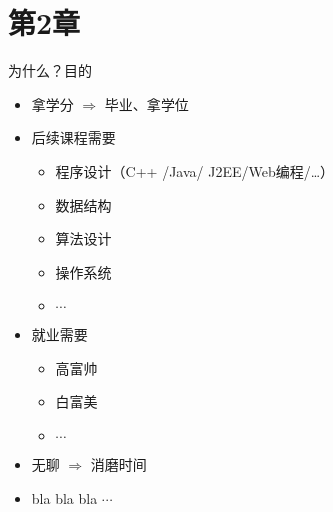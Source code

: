 \section[第2章]{第2章}
\begin{frame}{为什么？}{目的}  
  \begin{itemize}
  \item { 拿学分 $\Rightarrow$ 毕业、拿\alert{学位}}
  \item { 后续课程需要}
    \begin{itemize}
    \item 程序设计（C++ /Java/ J2EE/Web编程/\dots）
    \item \alert{数据结构}
    \item 算法设计
    \item 操作系统
    \item $\cdots$
    \end{itemize}
  \item { 就业需要}
    \begin{itemize}
    \item 高富帅
    \item 白富美
    \item $\cdots$
    \end{itemize}
  \item { 无聊 $\Rightarrow$ 消磨时间}  
  \item { bla bla bla $\cdots$}             
  \end{itemize}
\end{frame}


